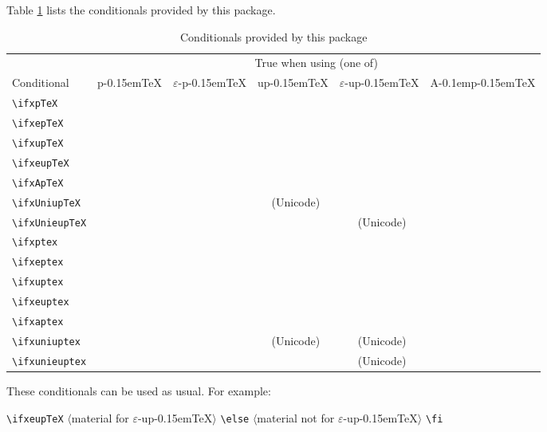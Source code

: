 \documentclass[a4paper]{article}
\newcommand\pTeX{p\kern-0.15em\TeX}
\newcommand\e{\ensuremath{\varepsilon}}
\newcommand\epTeX{\e-\pTeX}
\newcommand\upTeX{u\pTeX}
\newcommand\eupTeX{\e-\upTeX}
\newcommand\ApTeX{A\kern-0.1em\pTeX}
\newcommand\yes{\checkmark}
\newcommand\UNI{(Unicode)}
\newcommand\uni{{\footnotesize\UNI}}
\begin{document}
Table \ref{tab:cond} lists the conditionals provided by this package.
\vskip-10pt\relax
\begin{table}[!ht]\centering
\caption{Conditionals provided by this package}
\label{tab:cond}
\begin{tabular}{lccccc}
\toprule
                     & \multicolumn{5}{c}{True when using (one of)}      \\
                       \cmidrule(lr){2-6}
Conditional          & \pTeX & \epTeX & \upTeX     & \eupTeX    & \ApTeX \\
\midrule
\verb|\ifxpTeX|      & \yes  &        &            &            &        \\
\verb|\ifxepTeX|     &       & \yes   &            &            &        \\
\verb|\ifxupTeX|     &       &        & \yes       &            &        \\
\verb|\ifxeupTeX|    &       &        &            & \yes       &        \\
\verb|\ifxApTeX|     &       &        &            &            & \yes   \\
\verb|\ifxUniupTeX|  &       &        & \yes\ \uni &            &        \\
\verb|\ifxUnieupTeX| &       &        &            & \yes\ \uni &        \\
\verb|\ifxptex|      & \yes  & \yes   & \yes       & \yes       & \yes   \\
\verb|\ifxeptex|     &       & \yes   &            & \yes       &        \\
\verb|\ifxuptex|     &       &        & \yes       & \yes       & \yes   \\
\verb|\ifxeuptex|    &       &        &            & \yes       &        \\
\verb|\ifxaptex|     &       &        &            &            & \yes   \\
\verb|\ifxuniuptex|  &       &        & \yes\ \uni & \yes\ \uni & \yes   \\
\verb|\ifxunieuptex| &       &        &            & \yes\ \uni &        \\
\bottomrule
\end{tabular}
\end{table}
\noindent These conditionals can be used as usual. For example:

\medskip

\noindent{\ttfamily\hskip2em}%
\verb|\ifxeupTeX|%
  \ensuremath{\langle}material     for \eupTeX\ensuremath{\rangle}%
\verb|\else|%
  \ensuremath{\langle}material not for \eupTeX\ensuremath{\rangle}%
\verb|\fi|
\end{document}
